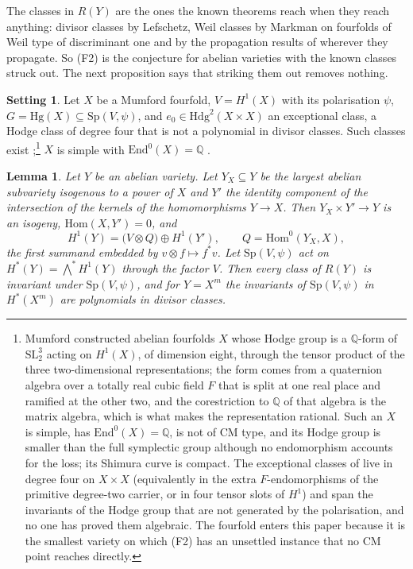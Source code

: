 \documentclass[11pt,reqno]{amsart}
\numberwithin{equation}{section}
\theoremstyle{plain}
\newtheorem{lemma}[theorem]{Lemma}
\theoremstyle{definition}
\newtheorem{setup}[theorem]{Setting}
\newcommand{\QQ}{\mathbb{Q}}
\newcommand{\Hdg}{\mathrm{Hdg}}
\newcommand{\Hg}{\mathrm{Hg}}
\newcommand{\Hom}{\mathrm{Hom}}
\newcommand{\End}{\mathrm{End}}
\newcommand{\Sp}{\mathrm{Sp}}
\newcommand{\Fii}{\texorpdfstring{\textup{(F2)}}{(F2)}}
\begin{document}
The classes in $R(Y)$ are the ones the known theorems reach when they reach anything: divisor classes by Lefschetz, Weil classes by Markman \cite{Mar23} on fourfolds of Weil type of discriminant one and by the propagation results of \cite{BMB26} wherever they propagate. So \Fii{} is the conjecture for abelian varieties with the known classes struck out. The next proposition says that striking them out removes nothing.

\begin{setup}\label{setup:mumford}
Let $X$ be a Mumford fourfold, $V=H^{1}(X)$ with its polarisation $\psi$, $G=\Hg(X)\subseteq\Sp(V,\psi)$, and $e_{0}\in\Hdg^{2}(X\times X)$ an exceptional class, a Hodge class of degree four that is not a polynomial in divisor classes. Such classes exist \cite{MZ95};\footnote{Mumford constructed \cite{Mum69} abelian fourfolds $X$ whose Hodge group is a $\QQ$-form of $\mathrm{SL}_{2}^{3}$ acting on $H^{1}(X)$, of dimension eight, through the tensor product of the three two-dimensional representations; the form comes from a quaternion algebra over a totally real cubic field $F$ that is split at one real place and ramified at the other two, and the corestriction to $\QQ$ of that algebra is the matrix algebra, which is what makes the representation rational. Such an $X$ is simple, has $\End^{0}(X)=\QQ$, is not of CM type, and its Hodge group is smaller than the full symplectic group although no endomorphism accounts for the loss; its Shimura curve is compact. The exceptional classes of \cite{MZ95} live in degree four on $X\times X$ (equivalently in the extra $F$-endomorphisms of the primitive degree-two carrier, or in four tensor slots of $H^{1}$) and span the invariants of the Hodge group that are not generated by the polarisation, and no one has proved them algebraic. The fourfold enters this paper because it is the smallest variety on which \Fii{} has an unsettled instance that no CM point reaches directly.} $X$ is simple with $\End^{0}(X)=\QQ$ \cite{Mum69}.
\end{setup}

\begin{lemma}\label{lem:sp-invariance}
Let $Y$ be an abelian variety. Let $Y_{X}\subseteq Y$ be the largest abelian subvariety isogenous to a power of $X$ and $Y'$ the identity component of the intersection of the kernels of the homomorphisms $Y\to X$. Then $Y_{X}\times Y'\to Y$ is an isogeny, $\Hom(X,Y')=0$, and
\[
H^{1}(Y)=\bigl(V\otimes Q\bigr)\oplus H^{1}(Y'),\qquad Q=\Hom^{0}(Y_{X},X),
\]
the first summand embedded by $v\otimes f\mapsto f^{*}v$. Let $\Sp(V,\psi)$ act on $H^{*}(Y)=\bigwedge^{*}H^{1}(Y)$ through the factor $V$. Then every class of $R(Y)$ is invariant under $\Sp(V,\psi)$, and for $Y=X^{m}$ the invariants of $\Sp(V,\psi)$ in $H^{*}(X^{m})$ are polynomials in divisor classes.
\end{lemma}
\end{document}
